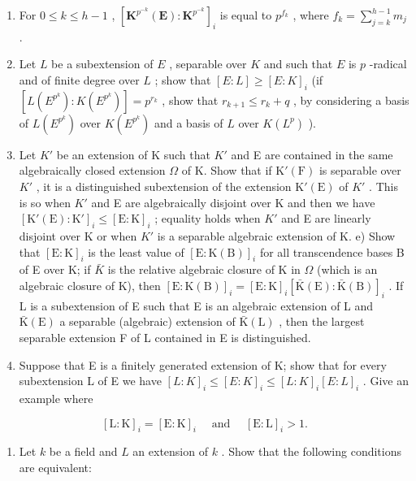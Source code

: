 \begin{enumerate}
\def\labelenumi{\alph{enumi})}
\setcounter{enumi}{1}
\item
  For \(0 \leqslant k \leqslant h - 1\) , \([\mathbf{K}^{p^{-k}}(\mathbf{E}) : \mathbf{K}^{p^{-k}}]_i\) is equal to \(p^{f_k}\) , where \(f_k = \sum_{j=k}^{h-1} m_j\) .
\item
  Let \(L\) be a subextension of \(E\) , separable over \(K\) and such that \(E\) is \(p\) -radical and of finite degree over \(L\) ; show that \([E:L] \geqslant [E:K]_i\) (if \([L(E^{p^k}):K(E^{p^k})] = p^{r_k}\) , show that \(r_{k+1} \leqslant r_k + q\) , by considering a basis of \(L(E^{p^k})\) over \(K(E^{p^k})\) and a basis of \(L\) over \(K(L^p)\) ).
\item
  Let \(K'\) be an extension of K such that \(K'\) and E are contained in the same algebraically closed extension \(\Omega\) of K. Show that if \(\mathrm{K}'(\mathrm{F})\) is separable over \(K'\) , it is a distinguished subextension of the extension \(\mathrm{K}'(\mathrm{E})\) of \(K'\) . This is so when \(K'\) and E are algebraically disjoint over K and then we have \([\mathrm{K}'(\mathrm{E}):\mathrm{K}']_{i}\leqslant[\mathrm{E}:\mathrm{K}]_{i}\) ; equality holds when \(K'\) and E are linearly disjoint over K or when \(K'\) is a separable algebraic extension of K. e) Show that \([\mathrm{E}:\mathrm{K}]_{i}\) is the least value of \([\mathrm{E}:\mathrm{K}(\mathrm{B})]_{i}\) for all transcendence bases B of E over K; if \(\bar{K}\) is the relative algebraic closure of K in \(\Omega\) (which is an algebraic closure of K), then \([\mathrm{E}:\mathrm{K}(\mathrm{B})]_{i}=[\mathrm{E}:\mathrm{K}]_{i}[\bar{\mathrm{K}}(\mathrm{E}):\bar{\mathrm{K}}(\mathrm{B})]_{i}\) . If L is a subextension of E such that E is an algebraic extension of L and \(\bar{\mathrm{K}}(\mathrm{E})\) a separable (algebraic) extension of \(\bar{\mathrm{K}}(\mathrm{L})\) , then the largest separable extension F of L contained in E is distinguished.
\item
  Suppose that E is a finitely generated extension of K; show that for every subextension L of E we have \([L:K]_{i} \leqslant [E:K]_{i} \leqslant [L:K]_{i}[E:L]_{i}\) . Give an example where
\end{enumerate}

\[
[ \mathrm{L}: \mathrm{K} ] _ {i} = [ \mathrm{E}: \mathrm{K} ] _ {i} \quad \text { and } \quad [ \mathrm{E}: \mathrm{L} ] _ {i} > 1.
\]

\begin{enumerate}
\def\labelenumi{\arabic{enumi})}
\setcounter{enumi}{7}
\tightlist
\item
  Let \(k\) be a field and \(L\) an extension of \(k\) . Show that the following conditions are equivalent:
\end{enumerate}

